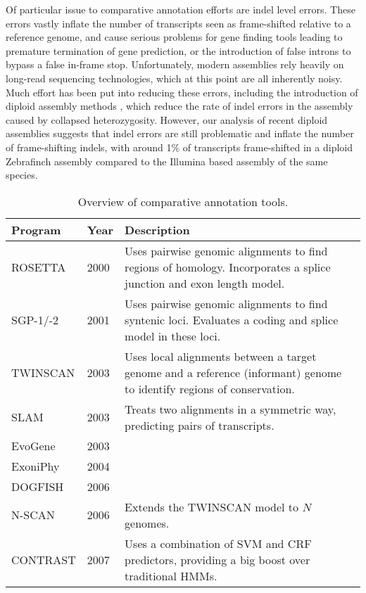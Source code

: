 \documentclass[fleqn,10pt]{wlscirep}
\begin{document}
Of particular issue to comparative annotation efforts are indel level errors. These errors vastly inflate the number of transcripts seen as frame-shifted relative to a reference genome, and cause serious problems for gene finding tools leading to premature termination of gene prediction, or the introduction of false introns to bypass a false in-frame stop. Unfortunately, modern assemblies rely heavily on long-read sequencing technologies, which at this point are all inherently noisy. Much effort has been put into reducing these errors, including the introduction of diploid assembly methods \cite{chin2016phased}, which reduce the rate of indel errors in the assembly caused by collapsed heterozygosity. However, our analysis of recent diploid assemblies suggests that indel errors are still problematic and inflate the number of frame-shifting indels, with around 1\% of transcripts frame-shifted in a diploid Zebrafinch assembly compared to the Illumina based assembly of the same species.



\begin{table}[ht]
\centering
\begin{tabular}{|l|l|p{12cm}|}
\hline
Program & Year & Description \\
\hline
ROSETTA & 2000 \cite{batzoglou2000human} & Uses pairwise genomic alignments to find regions of homology. Incorporates a splice junction and exon length model. \\
\hline
SGP-1/-2 & 2001 \cite{wiehe2001sgp} & Uses pairwise genomic alignments to find syntenic loci. Evaluates a coding and splice model in these loci.  \\
\hline
TWINSCAN & 2003 \cite{flicek2003leveraging} & Uses local alignments between a target genome and a reference (informant) genome to identify regions of conservation. \\
\hline
SLAM & 2003 \cite{alexandersson2003slam} & Treats two alignments in a symmetric way, predicting pairs of transcripts. \\
\hline
EvoGene & 2003 \cite{pedersen2003gene} & \\
\hline
ExoniPhy & 2004 \cite{siepel2004computational} & \\
\hline
DOGFISH & 2006 \cite{carter2006vertebrate} & \\
\hline
N-SCAN & 2006 \cite{gross2006using} & Extends the TWINSCAN model to $N$ genomes. \\
\hline
CONTRAST & 2007 \cite{gross2007contrast} & Uses a combination of SVM and CRF predictors, providing a big boost over traditional HMMs. \\
\hline
\end{tabular}
\caption{\label{tab:history}Overview of comparative annotation tools.}
\end{table}
\end{document}
